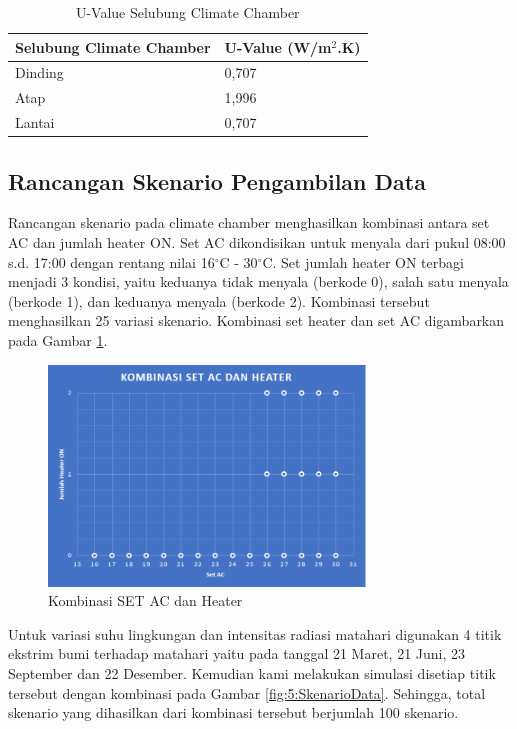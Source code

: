 \begin{table}[!h]
	\caption{U-Value Selubung Climate Chamber\cite{skripsiTanto}}
	\label{tbl:5:UValue}
	\centering
	\begin{tabular}{|p{5.7cm}|p{5cm}|}
		\hline
		\textbf{Selubung Climate Chamber} & \textbf{U-Value (W/m$^2$.K)} \\ \hline
		Dinding & 0,707 \\ \hline
		Atap & 1,996 \\ \hline 
		Lantai & 0,707 \\ \hline
	\end{tabular}
\end{table}
\vspace{1em}
\break

\subsection{Rancangan Skenario Pengambilan Data}
Rancangan skenario pada climate chamber menghasilkan kombinasi antara set AC dan jumlah heater ON. Set AC dikondisikan untuk menyala dari pukul 08:00 s.d. 17:00 dengan rentang nilai 16$^\circ$C - 30$^\circ$C. Set jumlah heater ON terbagi menjadi 3 kondisi, yaitu keduanya tidak menyala (berkode 0), salah satu menyala (berkode 1), dan keduanya menyala (berkode 2). Kombinasi tersebut menghasilkan 25 variasi skenario. Kombinasi set heater dan set AC digambarkan pada Gambar \ref{fig:5:HeaterAC}.

\begin{figure}[!h]
	\centering
	\includegraphics[width=0.75\textwidth]{figures/HeaterAC}
	\caption{Kombinasi SET AC dan Heater}
	\label{fig:5:HeaterAC}
\end{figure}
\vspace{1em}

Untuk variasi suhu lingkungan dan intensitas radiasi matahari digunakan 4 titik ekstrim bumi terhadap matahari yaitu pada tanggal 21 Maret, 21 Juni, 23 September dan 22 Desember. Kemudian kami melakukan simulasi disetiap titik tersebut dengan kombinasi pada Gambar \ref{fig:5:SkenarioData}. Sehingga, total skenario yang dihasilkan dari kombinasi tersebut berjumlah 100 skenario.

